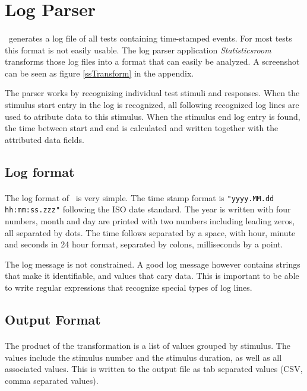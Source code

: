 \section{Log Parser\label{Log}}
\paragraph{}
\ER\ generates  a log file of all tests containing time-stamped events.
For most tests this format is not easily usable.
The log parser application \textit{Statisticsroom} transforms those log files into a format that can easily be analyzed.
A screenshot can be seen as figure \ref{ssTransform} in the appendix.

The parser works by recognizing individual test stimuli and responses.
When the stimulus start entry in the log is recognized, all following recognized log lines are used to atribute data to this stimulus.
When the stimulus end log entry is found, the time between start and end is calculated and written together with the attributed data fields.

\subsection{Log format}
\paragraph{}
The log format of \ER\ is very simple.
The time stamp format is \lstinline{"yyyy.MM.dd hh:mm:ss.zzz"} following the ISO date standard.
The year is written with four numbers, month and day are printed with two numbers including leading zeros, all separated by dots.
The time follows separated by a space, with hour, minute and seconds in 24 hour format, separated by colons, milliseconds by a point.

The log message is not constrained.
A good log message however contains strings that make it identifiable, and values that cary data.
This is important to be able to write regular expressions that recognize special types of log lines.


\subsection{Output Format}
\paragraph{}
The product of the transformation is a list of values grouped by stimulus.
The values include the stimulus number and the stimulus duration, as well as all associated values.
This is written to the output file as tab separated values (CSV, comma separated values).


